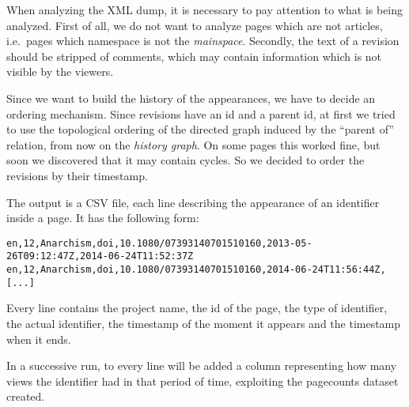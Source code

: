 When analyzing the XML dump, it is necessary to pay attention to what is being analyzed.
First of all, we do not want to analyze pages which are not articles, i.e.\ pages which namespace is not the \emph{mainspace}.
Secondly, the text of a revision should be stripped of comments, which may contain information which is not visible by the viewers.

Since we want to build the history of the appearances, we have to decide an ordering mechanism.
Since revisions have an id and a parent id, at first we tried to use the topological ordering of the directed graph induced by the ``parent of'' relation, from now on the \emph{history graph}.
On some pages this worked fine, but soon we discovered that it may contain cycles.
So we decided to order the revisions by their timestamp.

The output is a CSV file, each line describing the appearance of an identifier inside a page.
It has the following form:
\begin{verbatim}
en,12,Anarchism,doi,10.1080/07393140701510160,2013-05-26T09:12:47Z,2014-06-24T11:52:37Z
en,12,Anarchism,doi,10.1080/07393140701510160,2014-06-24T11:56:44Z,
[...]
\end{verbatim}
Every line contains the project name, the id of the page, the type of identifier, the actual identifier, the timestamp of the moment it appears and the timestamp when it ends.

In a successive run, to every line will be added a column representing how many views the identifier had in that period of time, exploiting the pagecounts dataset created.
